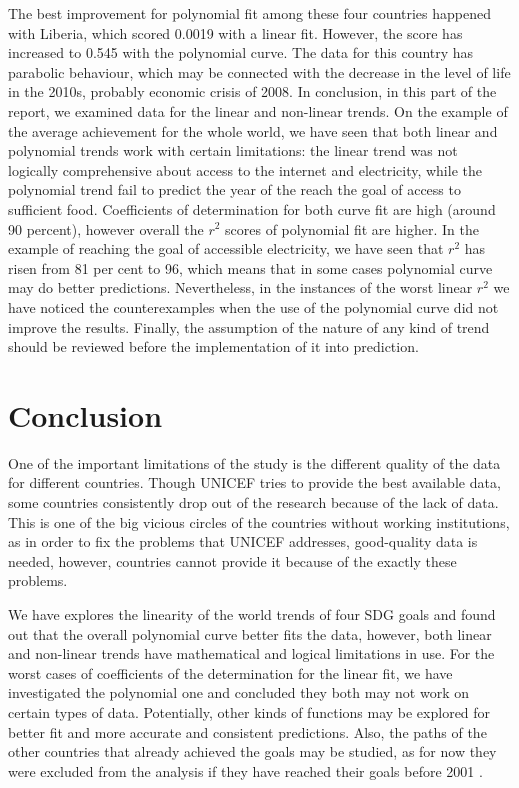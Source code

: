 \documentclass[reprint, onecolumn, amsmath, amssymb, showpacs, superscriptaddress, aps, prl]{revtex4-2}
\begin{document}
The best improvement for polynomial fit among these four countries happened with Liberia, which scored 0.0019 with a linear fit. However, the score has increased to 0.545 with the polynomial curve. The data for this country has parabolic behaviour, which may be connected with the decrease in the level of life in the 2010s, probably economic crisis of 2008. 
In conclusion, in this part of the report, we examined data for the linear and non-linear trends. On the example of the average achievement for the whole world, we have seen that both linear and polynomial trends work with certain limitations: the linear trend was not logically comprehensive about access to the internet and electricity, while the polynomial trend fail to predict the year of the reach the goal of access to sufficient food. Coefficients of determination for both curve fit are high (around 90 percent), however overall the \(r^2\) scores of polynomial fit are higher. In the example of reaching the goal of accessible electricity, we have seen that \(r^2\) has risen from 81 per cent to 96, which means that in some cases polynomial curve may do better predictions. Nevertheless, in the instances of the worst linear \(r^2\) we have noticed the counterexamples when the use of the polynomial curve did not improve the results. Finally, the assumption of the nature of any kind of trend should be reviewed before the implementation of it into prediction. 


\section{Conclusion}

One of the important limitations of the study is the different quality of the data for different countries. Though UNICEF tries to provide the best available data, some countries consistently drop out of the research because of the lack of data. This is one of the big vicious circles of the countries without working institutions, as in order to fix the problems that UNICEF addresses, good-quality data is needed, however, countries cannot provide it because of the exactly these problems. 

We have explores the linearity of the world trends of four SDG goals and found out that the overall polynomial curve better fits the data, however, both linear and non-linear trends have mathematical and logical limitations in use. For the worst cases of coefficients of the determination for the linear fit, we have investigated the polynomial one and concluded they both may not work on certain types of data. Potentially, other kinds of functions may be explored for better fit and more accurate and consistent predictions. Also, the paths of the other countries that already achieved the goals may be studied, as for now they were excluded from the analysis if they have reached their goals before 2001 \cite{diaz2018sustainable}. 
\end{document}
